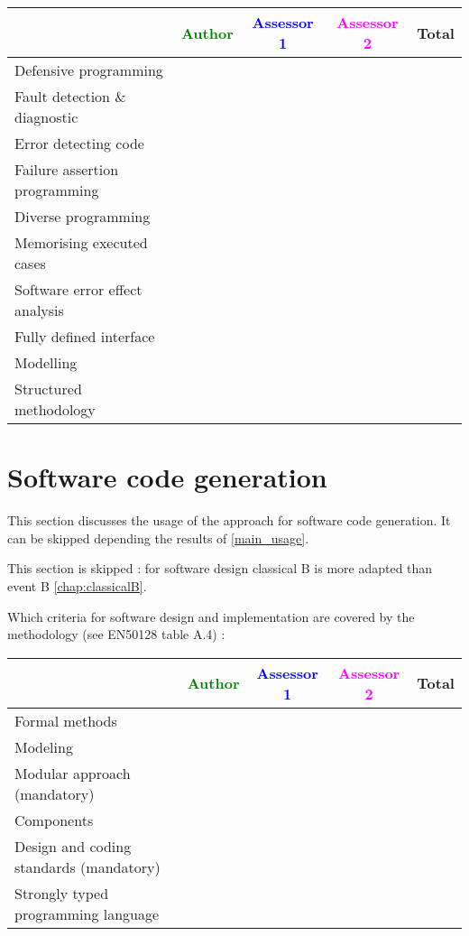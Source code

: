 \begin{tabular}{|l | c | c | c | c|}
\hline
& \textcolor{green}{Author} & \textcolor{blue}{Assessor 1} & \textcolor{magenta}{Assessor 2} & Total \\
\hline
Defensive programming  & & & &  \\
\hline 
Fault detection \& diagnostic  & & & &  \\
\hline
Error detecting code  & & & &  \\
\hline
Failure assertion programming & & & &  \\
\hline
Diverse programming & & & &  \\
\hline
Memorising executed cases & & & &  \\
\hline
Software error effect analysis & & & &  \\
\hline
Fully defined interface & & & &  \\
\hline
Modelling  & & & &  \\
\hline
Structured methodology & & & &  \\
\hline
\end{tabular}

\section{Software code generation}
This section discusses the usage of the approach for software code generation.
It can be skipped depending the results of \ref{main_usage}.


\begin{author_comment}
This section is skipped :  for software design classical B is more adapted than event B \ref{chap:classicalB}.
\end{author_comment}


Which criteria for software design and implementation are covered by the methodology
(see EN50128 table A.4) :

\begin{tabular}{|l | c | c | c | c|}
\hline
& \textcolor{green}{Author} & \textcolor{blue}{Assessor 1} & \textcolor{magenta}{Assessor 2} & Total \\
\hline
Formal methods  & & & &  \\
\hline 
Modeling  & & & &  \\
\hline
Modular approach (mandatory) & & & &  \\
\hline
Components & & & &  \\
\hline
Design and coding standards (mandatory) & & & &  \\
\hline
Strongly typed programming language & & & &  \\
\hline

\end{tabular}



